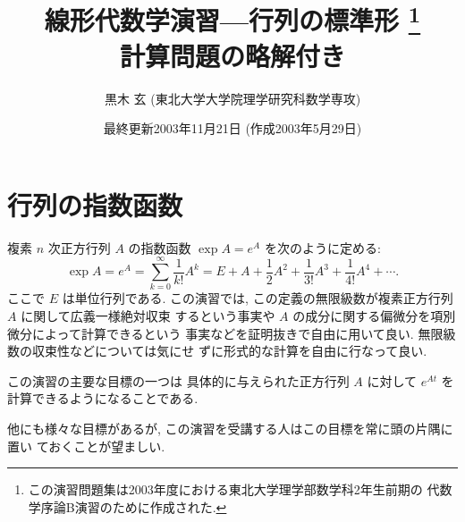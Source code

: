 \documentclass[12pt,twoside]{jarticle}
\begin{document}

\title{\bf 線形代数学演習---行列の標準形
  \thanks{この演習問題集は2003年度における東北大学理学部数学科2年生前期の
    代数学序論B演習のために作成された.}
  \ifx\STUDENT\undefined\\{\normalsize 計算問題の略解付き}\fi}

\author{黒木 玄 \quad (東北大学大学院理学研究科数学専攻)}

\date{最終更新2003年11月21日 \quad (作成2003年5月29日)}

\maketitle

\tableofcontents


\section{行列の指数函数}
\label{sec:exp}

複素 $n$ 次正方行列 $A$ の指数函数 $\exp A = e^A$ を次のように定める:
\begin{equation*}
  \exp A = e^A 
  = \sum_{k=0}^\infty \frac{1}{k!} A^k
  = E + A + \frac{1}{2}A^2 + \frac{1}{3!}A^3 + \frac{1}{4!}A^4 + \cdots.
\end{equation*}
ここで $E$ は単位行列である.
この演習では, この定義の無限級数が複素正方行列 $A$ に関して広義一様絶対収束
するという事実や $A$ の成分に関する偏微分を項別微分によって計算できるという
事実などを証明抜きで自由に用いて良い.  無限級数の収束性などについては気にせ
ずに形式的な計算を自由に行なって良い.

\bigskip

{\Large この演習の主要な目標の一つは
具体的に与えられた正方行列 $A$ に対して $e^{At}$ を
計算できるようになることである.}

\bigskip

他にも様々な目標があるが, この演習を受講する人はこの目標を常に頭の片隅に置い
ておくことが望ましい.

\end{document}
